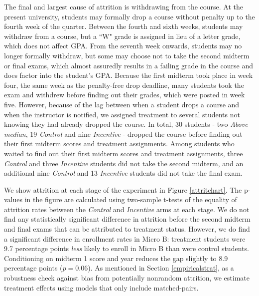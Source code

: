 \documentclass[12pt]{article}
\begin{document}
The final and largest cause of attrition is withdrawing from the course. At the present university, students may formally drop a course without penalty up to the fourth week of the quarter. Between the fourth and sixth weeks, students may withdraw from a course, but a ``W" grade is assigned in lieu of a letter grade, which does not affect GPA. From the seventh week onwards, students may no longer formally withdraw, but some may choose not to take the second midterm or final exams, which almost assuredly results in a failing grade in the course and does factor into the student's GPA. Because the first midterm took place in week four, the same week as the penalty-free drop deadline, many students took the exam and withdrew before finding out their grades, which were posted in week five. However, because of the lag between when a student drops a course and when the instructor is notified, we assigned treatment to several students not knowing they had already dropped the course. In total, 30 students - two \textit{Above median}, 19 \textit{Control} and nine \textit{Incentive} - dropped the course before finding out their first midterm scores and treatment assignments. Among students who waited to find out their first midterm scores and treatment assignments, three \textit{Control} and three \textit{Incentive} students did not take the second midterm, and an additional nine \textit{Control} and 13 \textit{Incentive} students did not take the final exam.

We show attrition at each stage of the experiment in Figure \ref{attritchart}. The p-values in the figure are calculated using two-sample t-tests of the equality of attrition rates between the \textit{Control} and \textit{Incentive} arms at each stage. We do not find any statistically significant difference in attrition before the second midterm and final exams that can be attributed to treatment status. However, we do find a significant difference in enrollment rates in Micro B: treatment students were 9.7 percentage points \textit{less} likely to enroll in Micro B than were control students. Conditioning on midterm 1 score and year reduces the gap slightly to 8.9 percentage points ($p=0.06$). As mentioned in Section \ref{empiricalstrat}, as a robustness check against bias from potentially nonrandom attrition, we estimate treatment effects using models that only include matched-pairs.
\end{document}
